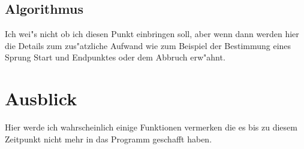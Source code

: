 \documentclass[11pt, a4paper, german]{article}
\begin{document}
	\subsection{Algorithmus}
	Ich wei"s nicht ob ich diesen Punkt einbringen soll, aber wenn dann werden hier die Details zum zus"atzliche Aufwand wie zum Beispiel der Bestimmung eines Sprung Start und Endpunktes oder dem Abbruch erw"ahnt.
	
	
\clearpage
\section{Ausblick}
Hier werde ich wahrscheinlich einige Funktionen vermerken die es bis zu diesem Zeitpunkt nicht mehr in das Programm geschafft haben.


\clearpage

\end{document}
